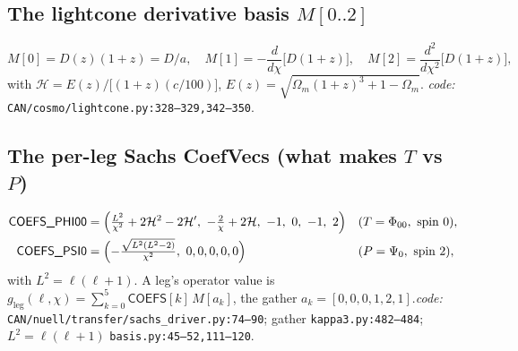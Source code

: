 \documentclass[11pt]{article}
\newcommand{\code}[1]{\texttt{\footnotesize #1}}
\newcommand{\chh}{\chi}
\newcommand{\Phizero}{\Phi_{00}}
\newcommand{\Psizero}{\Psi_{0}}
\newcommand{\Dgrow}{D}
\newcommand{\Hcal}{\mathcal{H}}
\begin{document}
\subsection{The lightcone derivative basis $M[0..2]$}
\label{sec:M}
\begin{equation}
M[0]=\Dgrow(z)(1{+}z)=\Dgrow/a,\quad
M[1]=-\frac{d}{d\chh}\bigl[\Dgrow(1{+}z)\bigr],\quad
M[2]=\frac{d^2}{d\chh^2}\bigl[\Dgrow(1{+}z)\bigr],
\end{equation}
with $\Hcal=E(z)/\bigl[(1{+}z)(c/100)\bigr]$, $E(z)=\sqrt{\Omega_m(1{+}z)^3+1-\Omega_m}$.
\textit{code:} \code{CAN/cosmo/lightcone.py:328--329,342--350}.

\subsection{The per-leg Sachs CoefVecs (what makes $T$ vs $P$)}
\label{sec:coef}
\begin{align}
\textsf{COEFS\_PHI00}&=\Bigl(\tfrac{L^2}{\chh^2}+2\Hcal^2-2\Hcal',\ -\tfrac{2}{\chh}+2\Hcal,\ -1,\ 0,\ -1,\ 2\Bigr) && (T=\Phizero,\ \text{spin }0),\\
\textsf{COEFS\_PSI0}&=\Bigl(-\tfrac{\sqrt{L^2(L^2-2)}}{\chh^2},\ 0,0,0,0,0\Bigr) && (P=\Psizero,\ \text{spin }2),
\end{align}
with $L^2=\ell(\ell+1)$. A leg's operator value is
$g_{\mathrm{leg}}(\ell,\chh)=\sum_{k=0}^{5}\textsf{COEFS}[k]\,M[a_k]$, the gather
$a_k=[0,0,0,1,2,1]$.\quad \textit{code:} \code{CAN/nuell/transfer/sachs\_driver.py:74--90};
gather \code{kappa3.py:482--484}; $L^2=\ell(\ell+1)$ \code{basis.py:45--52,111--120}.
\end{document}
